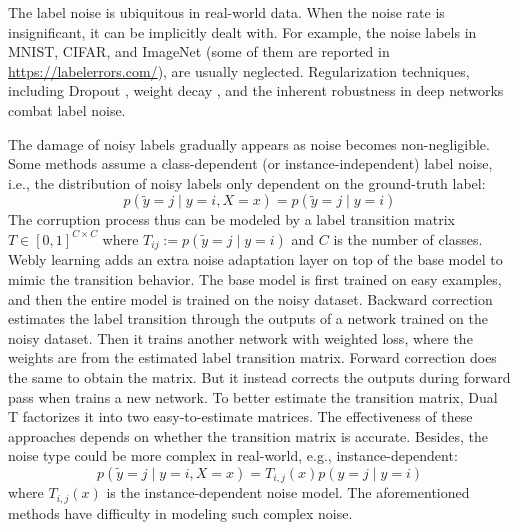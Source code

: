 \documentclass[letterpaper]{article} \usepackage{aaai23}  \usepackage{times}  \usepackage{helvet}  \usepackage{courier}  \usepackage[hyphens]{url}  \usepackage{graphicx} \urlstyle{rm} \def\UrlFont{\rm}  \usepackage{natbib}  \usepackage{caption} \frenchspacing  \setlength{\pdfpagewidth}{8.5in} \setlength{\pdfpageheight}{11in} \usepackage{algorithm}
\begin{document}
The label noise is ubiquitous in real-world data.
When the noise rate is insignificant, it can be implicitly dealt with.
For example, the noise labels in MNIST, CIFAR, and ImageNet (some of them are reported in \url{https://labelerrors.com/}), are usually neglected.
Regularization techniques, including Dropout \cite{srivastava2014dropout}, weight decay \cite{krogh1992simple}, and the inherent robustness in deep networks \cite{zhang2016understanding} combat label noise.

The damage of noisy labels gradually appears as noise becomes non-negligible.
Some methods assume a class-dependent (or instance-independent) label noise, i.e., the distribution of noisy labels only dependent on the ground-truth label:
\begin{equation}
    p(\tilde{y}=j\mid y=i,X=x)=p(\tilde{y}=j\mid y=i)
\end{equation}
The corruption process thus can be modeled by a label transition matrix $T\in [0,1]^{C \times C}$ where $T_{ij}:=p(\tilde{y}=j\mid y=i)$ and $C$ is the number of classes.
Webly learning \cite{chen2015webly} adds an extra noise adaptation layer on top of the base model to mimic the transition behavior.
The base model is first trained on easy examples, and then the entire model is trained on the noisy dataset.  
Backward correction \cite{patrini2017making} estimates the label transition through the outputs of a network trained on the noisy dataset.
Then it trains another network with weighted loss, where the weights are from the estimated label transition matrix.
Forward correction \cite{patrini2017making} does the same to obtain the matrix. 
But it instead corrects the outputs during forward pass when trains a new network.
To better estimate the transition matrix, Dual T \cite{yao2020dual} factorizes it into two easy-to-estimate matrices.
The effectiveness of these approaches depends on whether the transition matrix is accurate. 
Besides, the noise type could be more complex in real-world, e.g., instance-dependent:
\begin{equation}
    p(\tilde{y}=j\mid y=i,X=x)=T_{i,j}(x)p(y=j\mid y=i)
\end{equation}
where $T_{i,j}(x)$ is the instance-dependent noise model.
The aforementioned methods have difficulty in modeling such complex noise.
\end{document}
